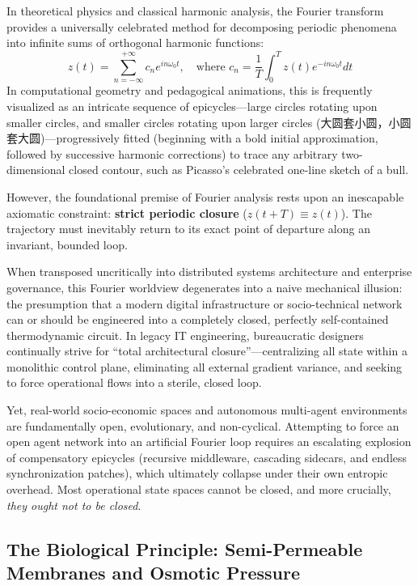 \documentclass[11pt,a4paper]{article}
\begin{document}
In theoretical physics and classical harmonic analysis, the Fourier transform provides a universally celebrated method for decomposing periodic phenomena into infinite sums of orthogonal harmonic functions:
\begin{equation}
z(t) = \sum_{n=-\infty}^{+\infty} c_n e^{i n \omega_0 t}, \quad \text{where } c_n = \frac{1}{T} \int_0^T z(t) e^{-i n \omega_0 t} dt
\end{equation}
In computational geometry and pedagogical animations, this is frequently visualized as an intricate sequence of epicycles---large circles rotating upon smaller circles, and smaller circles rotating upon larger circles (大圆套小圆，小圆套大圆)---progressively fitted (beginning with a bold initial approximation, followed by successive harmonic corrections) to trace any arbitrary two-dimensional closed contour, such as Picasso's celebrated one-line sketch of a bull.

However, the foundational premise of Fourier analysis rests upon an inescapable axiomatic constraint: \textbf{strict periodic closure} ($z(t + T) \equiv z(t)$). The trajectory must inevitably return to its exact point of departure along an invariant, bounded loop.

When transposed uncritically into distributed systems architecture and enterprise governance, this Fourier worldview degenerates into a naive mechanical illusion: the presumption that a modern digital infrastructure or socio-technical network can or should be engineered into a completely closed, perfectly self-contained thermodynamic circuit. In legacy IT engineering, bureaucratic designers continually strive for ``total architectural closure''---centralizing all state within a monolithic control plane, eliminating all external gradient variance, and seeking to force operational flows into a sterile, closed loop.

Yet, real-world socio-economic spaces and autonomous multi-agent environments are fundamentally open, evolutionary, and non-cyclical. Attempting to force an open agent network into an artificial Fourier loop requires an escalating explosion of compensatory epicycles (recursive middleware, cascading sidecars, and endless synchronization patches), which ultimately collapse under their own entropic overhead. Most operational state spaces cannot be closed, and more crucially, \textit{they ought not to be closed}.

\subsection{The Biological Principle: Semi-Permeable Membranes and Osmotic Pressure}
\end{document}
